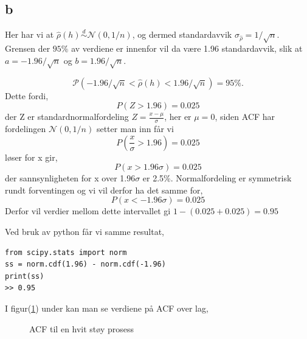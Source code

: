 \documentclass[12pt]{article}
\begin{document}
{\subsection{b}

Her har vi at $\hat{\rho}(h) \stackrel {d}{\sim}  \mathcal{N}(0,1/n)$, og dermed standardavvik $\sigma_{\hat{\rho}} = 1/\sqrt{n}$. Grensen der $95\%$ av verdiene er innenfor vil da være 1.96 standardavvik,
slik at $a = -1.96/\sqrt{n}$ og $b = 1.96/\sqrt{n}$.

\begin{equation}
  \mathcal{P}(-1.96/\sqrt{n} < \hat{\rho}(h) < 1.96/\sqrt{n}) = 95\%.
\end{equation}
Dette fordi,
\begin{equation*}
  P(Z > 1.96) = 0.025
\end{equation*}
der Z er standardnormalfordeling $Z = \frac{x - \mu}{\sigma}$, her er $\mu = 0$, siden ACF har fordelingen $\mathcal{N}(0,1/n)$
setter man inn får vi
\begin{equation*}
  P(\frac{x}{\sigma} > 1.96) = 0.025
\end{equation*}
løser for x gir,
\begin{equation*}
  P(x > 1.96\sigma) = 0.025
\end{equation*}
der sannsynligheten for x over 1.96$\sigma$ er 2.5\%.
Normalfordeling er symmetrisk rundt forventingen og vi vil derfor ha det samme for,
\begin{equation*}
  P(x < -1.96\sigma) = 0.025
\end{equation*}
Derfor vil verdier mellom dette intervallet gi $1 - (0.025 + 0.025)  = 0.95$

Ved bruk av python får vi samme resultat,
\newpage
\begin{lstlisting}
from scipy.stats import norm
ss = norm.cdf(1.96) - norm.cdf(-1.96)
print(ss)
>> 0.95
\end{lstlisting}

I figur(\ref{ACF}) under kan man se verdiene på ACF over lag,

\begin{figure}[hbt!]
\caption{ACF til en hvit støy prosess}
\label{ACF}
\end{figure}

}
\end{document}
